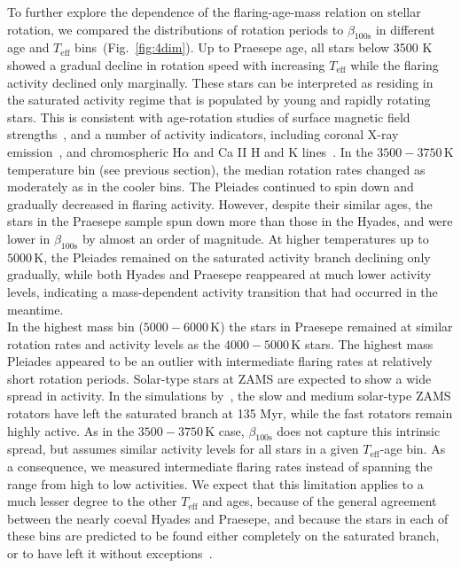 \documentclass{aa}
\begin{document}
To further explore the dependence of the flaring-age-mass relation on stellar rotation, we compared the distributions of rotation periods to $\beta_\mathrm{100s}$ in different age and $T_\mathrm{eff}$ bins~(Fig.~\ref{fig:4dim}). Up to Praesepe age, all stars below 3500 K showed a gradual decline in rotation speed with increasing $T_\mathrm{eff}$ while the flaring activity declined only marginally. These stars can be interpreted as residing in the saturated activity regime that is populated by young and rapidly rotating stars. This is consistent with age-rotation studies of surface magnetic field strengths~\citep{vidotto2014}, and a number of activity indicators, including coronal X-ray emission~\citep{pizzolato2003,wright2011}, and chromospheric H$\alpha$ and Ca II H and K lines~\citep{mamajek2008,west2015,newton2017}. In the $3500-3750$\,K temperature bin (see previous section), the median rotation rates changed as moderately as in the cooler bins. The Pleiades continued to spin down and gradually decreased in flaring activity. However, despite their similar ages, the stars in the Praesepe sample spun down more than those in the Hyades, and were lower in $\beta_\mathrm{100s}$ by almost an order of magnitude. At higher temperatures up to $5000$\,K, the Pleiades remained on the saturated activity branch declining only gradually, while both Hyades and Praesepe reappeared at much lower activity levels, indicating a mass-dependent activity transition that had occurred in the meantime.
\\
In the highest mass bin ($5000-6000$\,K) the stars in Praesepe remained at similar rotation rates and activity levels as the $4000-5000$\,K stars. The highest mass Pleiades appeared to be an outlier with intermediate flaring rates at relatively short rotation periods. Solar-type stars at ZAMS are expected to show a wide spread in activity. In the simulations by~\citet{johnstone2020}, the slow and medium solar-type ZAMS rotators have left the saturated branch at 135 Myr, while the fast rotators remain highly active. As in the $3500-3750$\,K case, $\beta_\mathrm{100s}$ does not capture this intrinsic spread, but assumes similar activity levels for all stars in a given $T_\mathrm{eff}$-age bin. As a consequence, we measured intermediate flaring rates instead of spanning the range from high to low activities. We expect that this limitation applies to a much lesser degree to the other $T_\mathrm{eff}$ and ages, because of the general agreement between the nearly coeval Hyades and Praesepe, and because the stars in each of these bins are predicted to be found either completely on the saturated branch, or to have left it without exceptions~\citep{johnstone2020}.
\end{document}
